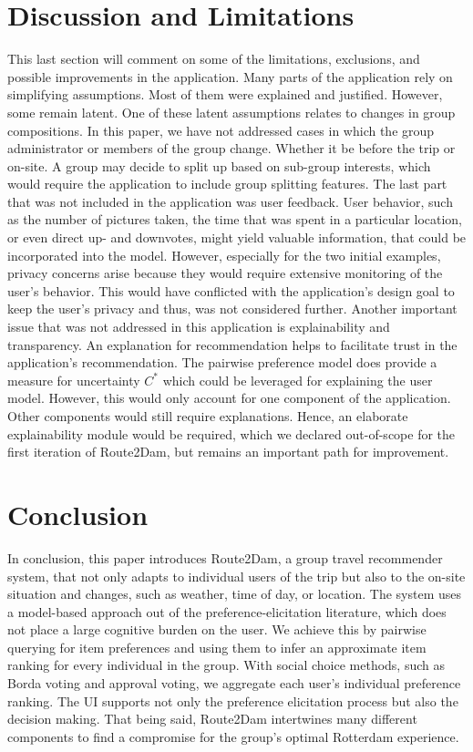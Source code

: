 \documentclass[11pt,a4paper,oneside]{article}
\begin{document}
\section{Discussion and Limitations}
This last section will comment on some of the limitations, exclusions, and possible improvements in the application. Many parts of the application rely on simplifying assumptions. Most of them were explained and justified. However, some remain latent. One of these latent assumptions relates to changes in group compositions. In this paper, we have not addressed cases in which the group administrator or members of the group change. Whether it be before the trip or on-site. A group may decide to split up based on sub-group interests, which would require the application to include group splitting features. The last part that was not included in the application was user feedback. User behavior, such as the number of pictures taken, the time that was spent in a particular location, or even direct up- and downvotes, might yield valuable information, that could be incorporated into the model. However, especially for the two initial examples, privacy concerns arise because they would require extensive monitoring of the user's behavior. This would have conflicted with the application's design goal to keep the user's privacy and thus, was not considered further. Another important issue that was not addressed in this application is explainability and transparency. An explanation for recommendation helps to facilitate trust in the application's recommendation. The pairwise preference model does provide a measure for uncertainty $C^*$ which could be leveraged for explaining the user model. However, this would only account for one component of the application. Other components would still require explanations. Hence, an elaborate explainability module would be required, which we declared out-of-scope for the first iteration of Route2Dam, but remains an important path for improvement.

\section{Conclusion}
In conclusion, this paper introduces Route2Dam, a group travel recommender system, that not only adapts to individual users of the trip but also to the on-site situation and changes, such as weather, time of day, or location. The system uses a model-based approach out of the preference-elicitation literature, which does not place a large cognitive burden on the user. We achieve this by pairwise querying for item preferences and using them to infer an approximate item ranking for every individual in the group. With social choice methods, such as Borda voting and approval voting, we aggregate each user's individual preference ranking. The UI supports not only the preference elicitation process but also the decision making. That being said, Route2Dam intertwines many different components to find a compromise for the group's optimal Rotterdam experience.
\end{document}
